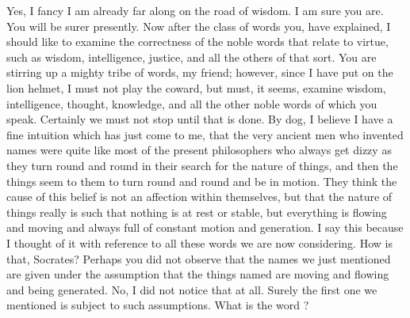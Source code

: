 {{{{Yes, I fancy I am already far along on the road of wisdom.
\hermogenesspeaks
I am sure you are.
\socratesspeaks
You will be surer presently. 
\hermogenesspeaks
Now after the class of words you, have explained, I should like to examine the correctness of the noble words that relate to virtue, such as wisdom, intelligence, justice, and all the others of that sort.
\socratesspeaks
You are stirring up a mighty tribe of words, my friend; however, since I have put on the lion helmet, I must not play the coward, but must, it seems, examine wisdom, intelligence, thought, knowledge,  and all the other noble words of which you speak.
\hermogenesspeaks
Certainly we must not stop until that is done.
\socratesspeaks
By dog, I believe I have a fine intuition which has just come to me, that the very ancient men who invented names were quite like most of the present philosophers who always get dizzy as they turn round and round in their search for the nature of things, and then the things seem to them to turn round and round and be in motion.  They think the cause of this belief is not an affection within themselves, but that the nature of things really is such that nothing is at rest or stable, but everything is flowing and moving and always full of constant motion and generation. I say this because I thought of it with reference to all these words we are now considering.
\hermogenesspeaks
How is that, Socrates?
\socratesspeaks
Perhaps you did not observe that the names we just mentioned are given under the assumption that the things named are moving and flowing and being generated.
\hermogenesspeaks
No, I did not notice that at all. 
\socratesspeaks
Surely the first one we mentioned is subject to such assumptions.
\hermogenesspeaks
What is the word ?
\socratesspeaks
}}}}
